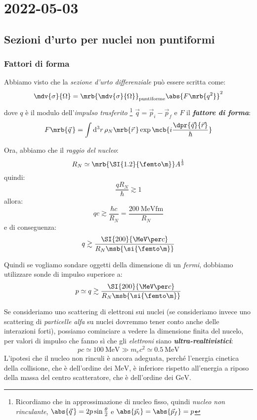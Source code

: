 \chapter{2022-05-03}
\section{Sezioni d'urto per nuclei non puntiformi}
\subsection{Fattori di forma}
Abbiamo visto che la \textit{sezione d'urto differenziale} può essere scritta
come:
\[
  \mdv{\sigma}{\Omega} = \mrb{\mdv{\sigma}{\Omega}}_\text{puntiforme} \abs{F
  \mrb{q^2}}^{2}
\]
dove $q$ è il modulo dell'\textit{impulso trasferito} \footnote{
  Ricordiamo che in approssimazione di nucleo fisso, quindi \textit{nucleo non
  rinculante}, $\abs{\vec{q}\,} = 2p \sin \frac{\theta}{2}$ e
  $\abs{\vec{p}_{i}} = \abs{\vec{p}_{f}} = p$
} $\vec{q} = \vec{p}_{i} - \vec{p}_{f}$ e
$F$ il \textit{\textbf{fattore di forma}}:
\[
  F \mrb{\vec{q}\,} = \int \mathrm{d}^{3} r \, \rho_N \mrb{\vec{r}\,} \exp
  \mcb{i \frac{\dpr{\vec{q}}{\vec{r}}}{\hbar}}
\]

Ora, abbiamo che il \textit{raggio del nucleo}:
\[
  R _{N} \simeq \mrb{\SI{1.2}{\femto\m}} A ^{\frac{1}{3}}
\]
quindi:
\[
  \frac{q R_N}{\hbar} \gtrsim 1
\]
allora:
\[
  qc \gtrsim \frac{\hbar c}{R_N} = \frac{\SI{200}{\MeV \femto\m}}{R_N}
\]
e di conseguenza:
\[
  q \gtrsim \frac{\SI{200}{\MeV \per c}}{R_N \msb{\si{\femto\m}}}
\]

Quindi se vogliamo sondare oggetti della dimensione di un \textit{fermi},
dobbiamo utilizzare sonde di impulso superiore a:
\[
  p \simeq q \gtrsim \frac{\SI{200}{\MeV \per c}}{R_N \msb{\si{\femto\m}}}
\]

Se consideriamo uno scattering di elettroni sui nuclei (se consideriamo invece
uno scattering di \textit{particelle alfa} su nuclei dovremmo tener conto anche
delle interazioni forti), possiamo cominciare a vedere la dimensione finita del
nucelo, per valori di impulso che fanno sì che gli \textit{elettroni}
siano \textit{\textbf{ultra-realtivistici}}:
\[
  pc \simeq \SI{100}{\MeV} \gg m_e c^2 \simeq \SI{0.5}{\MeV}
\]
L'ipotesi che il nucleo non rinculi è ancora adeguata, perché l'energia
cinetica della collisione, che è dell'ordine dei $\si{\MeV}$, è inferiore
rispetto all'energia a riposo della massa del centro scatteratore, che è
dell'ordine dei $\si{\GeV}$.

